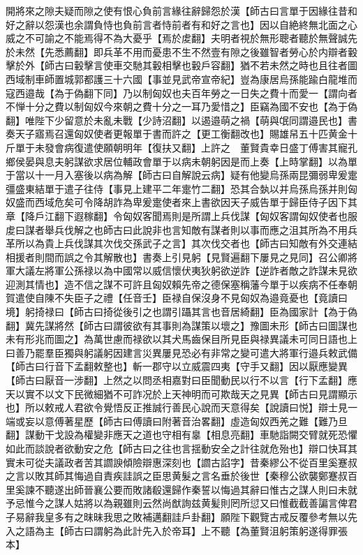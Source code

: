 開將來之隙夫疑而隙之使有恨心負前言緣往辭歸怨於漢【師古曰言單于因緣往昔和好之辭以怨漢也余謂負恃也負前言者恃前者有和好之言也】因以自絶終無北面之心威之不可諭之不能焉得不為大憂乎【焉於䖍翻】夫明者視於無形聰者聽於無聲誠先於未然【先悉薦翻】即兵革不用而憂患不生不然壹有隙之後雖智者勞心於内辯者轂擊於外【師古曰轂擊言使車交馳其轂相擊也轂戶容翻】猶不若未然之時也且往者圖西域制車師置城郭都護三十六國【事並見武帝宣帝紀】豈為康居烏孫能踰白龍堆而寇西邉哉【為于偽翻下同】乃以制匈奴也夫百年勞之一日失之費十而愛一【謂向者不惮十分之費以制匈奴今來朝之費十分之一耳乃愛惜之】臣竊為國不安也【為于偽翻】唯陛下少留意於未亂未戰【少詩沼翻】以遏邉萌之禍【萌與氓同謂邉民也】書奏天子寤焉召還匈奴使者更報單于書而許之【更工衡翻改也】賜雄帠五十匹黄金十斤單于未發會病復遣使願朝明年【復扶又翻】上許之　董賢貴幸日盛丁傅害其寵孔鄉侯晏與息夫躬謀欲求居位輔政會單于以病未朝躬因是而上奏【上時掌翻】以為單于當以十一月入塞後以病為解【師古曰自解說云病】疑有他變烏孫兩昆彌弱卑爰疐彊盛東結單于遣子往侍【事見上建平二年疐竹二翻】恐其合埶以并烏孫烏孫并則匈奴盛而西域危矣可令降胡詐為卑爰疐使者來上書欲因天子威告單于歸臣侍子因下其章【降戶江翻下遐稼翻】令匈奴客聞焉則是所謂上兵伐謀【匈奴客謂匈奴使者也服䖍曰謀者舉兵伐解之也師古曰此說非也言知敵有謀者則以事而應之沮其所為不用兵革所以為貴上兵伐謀其次伐交孫武子之言】其次伐交者也【師古曰知敵有外交連結相援者則間而誤之令其解散也】書奏上引見躬【見賢遍翻下屢見之見同】召公卿將軍大議左將軍公孫禄以為中國常以威信懷伏夷狄躬欲逆詐【逆詐者敵之詐謀未見欲迎測其情也】造不信之謀不可許且匈奴賴先帝之德保塞稱藩今單于以疾病不任奉朝賀遣使自陳不失臣子之禮【任音壬】臣禄自保沒身不見匈奴為邉竟憂也【竟讀曰境】躬掎禄曰【師古曰掎從後引之也謂引躡其言也音居綺翻】臣為國家計【為于偽翻】冀先謀將然【師古曰謂彼欲有其事則為謀策以壞之】豫圖未形【師古曰圖謀也未有形兆而圖之】為萬世慮而禄欲以其犬馬齒保目所見臣與禄異議未可同日語也上曰善乃罷羣臣獨與躬議躬因建言災異屢見恐必有非常之變可遣大將軍行邉兵敕武備【師古曰行音下孟翻敕整也】斬一郡守以立威震四夷【守手又翻】因以厭應變異【師古曰厭音一涉翻】上然之以問丞相嘉對曰臣聞動民以行不以言【行下孟翻】應天以實不以文下民微細猶不可詐况於上天神明而可欺哉天之見異【師古曰見謂顯示也】所以敕戒人君欲令覺悟反正推誠行善民心說而天意得矣【說讀曰悦】辯士見一端或妄以意傅著星歷【師古曰傅讀曰附著音治畧翻】虛造匈奴西羌之難【難乃旦翻】謀動干戈設為權變非應天之道也守相有辠【相息亮翻】車馳詣闕交臂就死恐懼如此而談說者欲動安之危【師古曰之往也言揺動安全之計往就危殆也】辯口快耳其實未可從夫議政者苦其讇諛傾險辯惠深刻也【讇古諂字】昔秦繆公不從百里奚蹇叔之言以敗其師其悔過自責疾詿誤之臣思黄髮之言名垂於後世【秦穆公欲襲鄭蹇叔百里奚諫不聽遂出師晉襄公要而敗諸殽還歸作秦誓以悔過其辭曰惟古之謀人則曰未就予忌惟今之謀人姑將以為親雖則云然尚猷詢兹黄髪則罔所愆又曰惟截截善諞言俾君子易辭我皇多有之昩昧我思之敗補邁翻詿戶卦翻】願陛下觀覽古戒反覆參考無以先入之語為主【師古曰謂躬為此計先入於帝耳】上不聽【為董賢沮躬策躬遂得罪張本】

